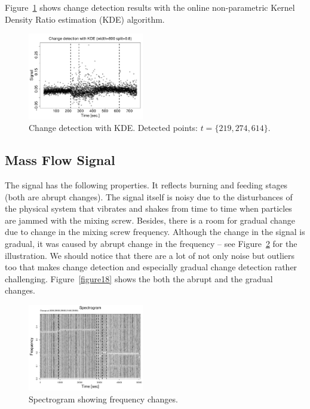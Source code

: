 Figure~\ref{figure12.1} shows change detection results with the online non-parametric Kernel Density Ratio estimation (KDE) algorithm.
\begin{figure}[htb!]
\includegraphics[width=0.45\textwidth]{articles/pics/cfb_paper/PSD/PSDkde}
\caption{Change detection with KDE. Detected points: $t=\{219,274,614\}$.}
\label{figure12.1}
\end{figure}

\subsection{Mass Flow Signal}

The signal has the following properties. It reflects burning and feeding stages (both are abrupt changes).
The signal itself is noisy due to the disturbances of the physical system that vibrates and shakes from time to time when particles are jammed with the mixing screw.
Besides, there is a room for gradual change due to change in the mixing screw frequency.
Although the change in the signal is gradual, it was caused by abrupt change in the frequency -- see Figure~\ref{figure15} for the illustration.
We should notice that there are a lot of not only noise but outliers too that
makes change detection and especially gradual change detection rather challenging.
Figure~\ref{figure18} shows the both the abrupt and the gradual changes.

\begin{figure}[htb!]
\includegraphics[width=0.45\textwidth]{articles/pics/cfb_paper/OMF/OMFspg}
\caption{Spectrogram showing frequency changes.}\label{figure15}
\end{figure}

